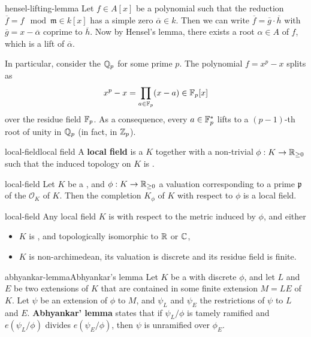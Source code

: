 \begin{example}{hensel-lifting-lemma}
    Let $f \in A[x]$ be a polynomial such that the reduction $\overline{f} = f \mod \mathfrak{m} \in k[x]$ has a simple zero $\overline{\alpha} \in k$. Then we can write $\overline{f} = \overline{g} \cdot \overline{h}$ with $\overline{g} = x - \overline{\alpha}$ coprime to $\overline{h}$. Now by Hensel's lemma, there exists a root $\alpha \in A$ of $f$, which is a lift of $\overline{\alpha}$.
    
    In particular, consider the  $\mathbb{Q}_p$ for some prime $p$. The polynomial $f = x^p - x$ splits as
    \[ x^p - x = \prod_{a \in \mathbb{F}_p} (x - a) \in \mathbb{F}_p[x] \]
    over the residue field $\mathbb{F}_p$. As a consequence, every $a \in \mathbb{F}_p^*$ lifts to a $(p - 1)$-th root of unity in $\mathbb{Q}_p$ (in fact, in $\mathbb{Z}_p$).
\end{example}

\begin{topic}{local-field}{local field}
    A \textbf{local field} is a  $K$ together with a non-trivial  $\phi : K \to \mathbb{R}_{\ge 0}$ such that the induced topology on $K$ is .
\end{topic}

\begin{example}{local-field}
    Let $K$ be a , and $\phi : K \to \mathbb{R}_{\ge 0}$ a valuation corresponding to a prime $\mathfrak{p}$ of the  $\mathcal{O}_K$ of $K$. Then the completion $K_\phi$ of $K$ with respect to $\phi$ is a local field.
\end{example}

\begin{example}{local-field}
    Any local field $K$ is  with respect to the metric induced by $\phi$, and either
    \begin{itemize}
        \item $K$ is , and topologically isomorphic to $\mathbb{R}$ or $\mathbb{C}$,
        \item $K$ is non-archimedean, its valuation is discrete and its residue field is finite.
    \end{itemize}
\end{example}

\begin{topic}{abhyankar-lemma}{Abhyankar's lemma}
    Let $K$ be a  with discrete  $\phi$, and let $L$ and $E$ be two extensions of $K$ that are contained in some finite extension $M = LE$ of $K$. Let $\psi$ be an extension of $\phi$ to $M$, and $\psi_L$ and $\psi_E$ the restrictions of $\psi$ to $L$ and $E$. \textbf{Abhyankar' lemma} states that if $\psi_L/\phi$ is tamely ramified and $e(\psi_L/\phi)$ divides $e(\psi_E/\phi)$, then $\psi$ is unramified over $\phi_E$.
\end{topic}

